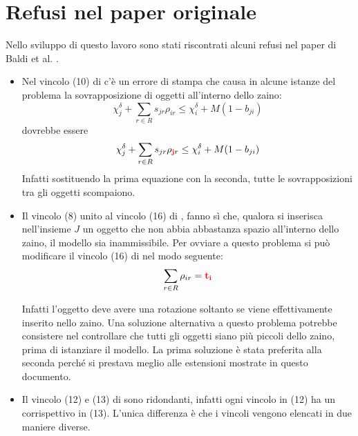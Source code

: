\section{Refusi nel paper originale}
\label{sec:refusi}
Nello sviluppo di questo lavoro sono stati riscontrati alcuni refusi nel paper 
di Baldi et al. \cite{Baldi20129802}.
\begin{itemize}
	\item Nel vincolo (10) di \cite{Baldi20129802} c'è un errore di stampa che 
	causa in alcune istanze del problema
	la sovrapposizione di oggetti all'interno dello zaino:
	$$
	\chi_j^\delta + \sum_{r\in R} s_{jr}\rho_{ir} \leq \chi_i^\delta + M(1-b_{ji})
	$$
	dovrebbe essere 
	$$
	\chi_j^\delta + \sum_{r\in R} s_{jr}\rho_{\mathbf{\color{red}j}r} \leq \chi_i^\delta + M(1-b_{ji})
	$$
	Infatti sostituendo la prima equazione con la seconda, tutte le 
	sovrapposizioni tra gli oggetti scompaiono.
	
	\item Il vincolo (8) unito al vincolo (16) di \cite{Baldi20129802}, 
	fanno sì che, qualora si inserisca nell'insieme $J$ un oggetto che non abbia
	abbastanza spazio all'interno dello zaino, il modello sia inammissibile.
	Per ovviare a questo problema si può modificare il vincolo (16) di
	\cite{Baldi20129802} nel modo seguente:
	$$
	\sum_{r \in R} \rho_{ir} = \color{red}\mathbf{t_i}
	$$
	
	
	Infatti l'oggetto deve avere una rotazione soltanto se viene effettivamente
	inserito nello zaino.
	Una soluzione alternativa a questo problema potrebbe consistere nel 
	controllare che tutti gli oggetti siano più piccoli dello zaino, 
	prima di istanziare il modello.
	La prima soluzione è stata preferita alla seconda perché si prestava meglio
	alle estensioni mostrate in questo documento.
	\item Il vincolo (12) e (13) di \cite{Baldi20129802} sono ridondanti, 
	infatti ogni vincolo in (12) ha un corrispettivo in (13). L'unica differenza
	è che i vincoli vengono elencati in due maniere diverse. 
\end{itemize}
